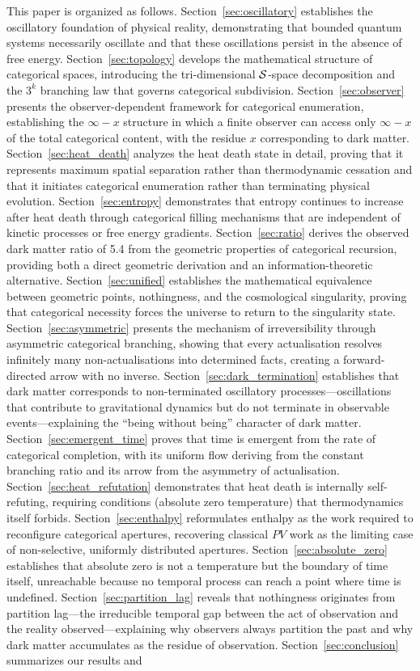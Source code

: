 This paper is organized as follows. Section~\ref{sec:oscillatory} establishes the oscillatory foundation of physical reality, demonstrating that bounded quantum systems necessarily oscillate and that these oscillations persist in the absence of free energy. Section~\ref{sec:topology} develops the mathematical structure of categorical spaces, introducing the tri-dimensional $\mathcal{S}$-space decomposition and the $3^k$ branching law that governs categorical subdivision. Section~\ref{sec:observer} presents the observer-dependent framework for categorical enumeration, establishing the $\infty - x$ structure in which a finite observer can access only $\infty - x$ of the total categorical content, with the residue $x$ corresponding to dark matter. Section~\ref{sec:heat_death} analyzes the heat death state in detail, proving that it represents maximum spatial separation rather than thermodynamic cessation and that it initiates categorical enumeration rather than terminating physical evolution. Section~\ref{sec:entropy} demonstrates that entropy continues to increase after heat death through categorical filling mechanisms that are independent of kinetic processes or free energy gradients. Section~\ref{sec:ratio} derives the observed dark matter ratio of 5.4 from the geometric properties of categorical recursion, providing both a direct geometric derivation and an information-theoretic alternative. Section~\ref{sec:unified} establishes the mathematical equivalence between geometric points, nothingness, and the cosmological singularity, proving that categorical necessity forces the universe to return to the singularity state. Section~\ref{sec:asymmetric} presents the mechanism of irreversibility through asymmetric categorical branching, showing that every actualisation resolves infinitely many non-actualisations into determined facts, creating a forward-directed arrow with no inverse. Section~\ref{sec:dark_termination} establishes that dark matter corresponds to non-terminated oscillatory processes—oscillations that contribute to gravitational dynamics but do not terminate in observable events—explaining the ``being without being'' character of dark matter. Section~\ref{sec:emergent_time} proves that time is emergent from the rate of categorical completion, with its uniform flow deriving from the constant branching ratio and its arrow from the asymmetry of actualisation. Section~\ref{sec:heat_refutation} demonstrates that heat death is internally self-refuting, requiring conditions (absolute zero temperature) that thermodynamics itself forbids. Section~\ref{sec:enthalpy} reformulates enthalpy as the work required to reconfigure categorical apertures, recovering classical $PV$ work as the limiting case of non-selective, uniformly distributed apertures. Section~\ref{sec:absolute_zero} establishes that absolute zero is not a temperature but the boundary of time itself, unreachable because no temporal process can reach a point where time is undefined. Section~\ref{sec:partition_lag} reveals that nothingness originates from partition lag—the irreducible temporal gap between the act of observation and the reality observed—explaining why observers always partition the past and why dark matter accumulates as the residue of observation. Section~\ref{sec:conclusion} summarizes our results and 